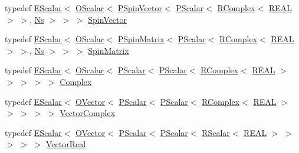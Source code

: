 \begin{DoxyCompactItemize}
\item 
typedef \mbox{\hyperlink{classENSEM_1_1EScalar}{E\+Scalar}}$<$ \mbox{\hyperlink{classENSEM_1_1OScalar}{O\+Scalar}}$<$ \mbox{\hyperlink{classENSEM_1_1PSpinVector}{P\+Spin\+Vector}}$<$ \mbox{\hyperlink{classENSEM_1_1PScalar}{P\+Scalar}}$<$ \mbox{\hyperlink{classENSEM_1_1RComplex}{R\+Complex}}$<$ \mbox{\hyperlink{namespaceENSEM_a6dd9aa6508168f545c861787e63ddd1e}{R\+E\+AL}} $>$ $>$, \mbox{\hyperlink{namespaceENSEM_a6f05e048f9b2eb1a19131074f8abc25f}{Ns}} $>$ $>$ $>$ \mbox{\hyperlink{group__defs_ga4cb5c4207c68050d0bd3e3e2d614bc78}{Spin\+Vector}}
\item 
typedef \mbox{\hyperlink{classENSEM_1_1EScalar}{E\+Scalar}}$<$ \mbox{\hyperlink{classENSEM_1_1OScalar}{O\+Scalar}}$<$ \mbox{\hyperlink{classENSEM_1_1PSpinMatrix}{P\+Spin\+Matrix}}$<$ \mbox{\hyperlink{classENSEM_1_1PScalar}{P\+Scalar}}$<$ \mbox{\hyperlink{classENSEM_1_1RComplex}{R\+Complex}}$<$ \mbox{\hyperlink{namespaceENSEM_a6dd9aa6508168f545c861787e63ddd1e}{R\+E\+AL}} $>$ $>$, \mbox{\hyperlink{namespaceENSEM_a6f05e048f9b2eb1a19131074f8abc25f}{Ns}} $>$ $>$ $>$ \mbox{\hyperlink{group__defs_gad066768e154e358a7f3c0708c774be29}{Spin\+Matrix}}
\item 
typedef \mbox{\hyperlink{classENSEM_1_1EScalar}{E\+Scalar}}$<$ \mbox{\hyperlink{classENSEM_1_1OScalar}{O\+Scalar}}$<$ \mbox{\hyperlink{classENSEM_1_1PScalar}{P\+Scalar}}$<$ \mbox{\hyperlink{classENSEM_1_1PScalar}{P\+Scalar}}$<$ \mbox{\hyperlink{classENSEM_1_1RComplex}{R\+Complex}}$<$ \mbox{\hyperlink{namespaceENSEM_a6dd9aa6508168f545c861787e63ddd1e}{R\+E\+AL}} $>$ $>$ $>$ $>$ $>$ \mbox{\hyperlink{group__defs_gabaa4aa11d5212d34042d08bf0b2f9cc0}{Complex}}
\item 
typedef \mbox{\hyperlink{classENSEM_1_1EScalar}{E\+Scalar}}$<$ \mbox{\hyperlink{classENSEM_1_1OVector}{O\+Vector}}$<$ \mbox{\hyperlink{classENSEM_1_1PScalar}{P\+Scalar}}$<$ \mbox{\hyperlink{classENSEM_1_1PScalar}{P\+Scalar}}$<$ \mbox{\hyperlink{classENSEM_1_1RComplex}{R\+Complex}}$<$ \mbox{\hyperlink{namespaceENSEM_a6dd9aa6508168f545c861787e63ddd1e}{R\+E\+AL}} $>$ $>$ $>$ $>$ $>$ \mbox{\hyperlink{group__defs_gab151d837d71acacce0e1c38e91e04fa3}{Vector\+Complex}}
\item 
typedef \mbox{\hyperlink{classENSEM_1_1EScalar}{E\+Scalar}}$<$ \mbox{\hyperlink{classENSEM_1_1OVector}{O\+Vector}}$<$ \mbox{\hyperlink{classENSEM_1_1PScalar}{P\+Scalar}}$<$ \mbox{\hyperlink{classENSEM_1_1PScalar}{P\+Scalar}}$<$ \mbox{\hyperlink{classENSEM_1_1RScalar}{R\+Scalar}}$<$ \mbox{\hyperlink{namespaceENSEM_a6dd9aa6508168f545c861787e63ddd1e}{R\+E\+AL}} $>$ $>$ $>$ $>$ $>$ \mbox{\hyperlink{group__defs_ga3ccd78d00f8c76c389577cc0dbe460fc}{Vector\+Real}}

\end{DoxyCompactItemize}
